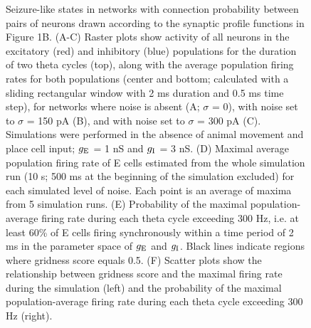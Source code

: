 \documentclass[a4paper,12pt]{article}
\newcommand{\ssc}[3]{\ensuremath{#1_{\text{#2}_{\text{#3}}}}}
\newcommand{\gE      }{\ssc{g}      {\scriptsize{E}}{}}
\newcommand{\gI      }{\ssc{g}      {\scriptsize{I}}{}}
\begin{document}
\begin{figure}[H]
    \internallinenumbers
    \caption{Seizure-like states in networks with connection probability
    between pairs of neurons drawn according to the synaptic profile functions
    in Figure 1B. (A-C) Raster plots show activity of all neurons in the
    excitatory (red) and inhibitory (blue) populations for the duration of two
    theta cycles (top), along with the average population firing rates for both
    populations (center and bottom; calculated with a sliding rectangular
    window with 2 ms duration and 0.5 ms time step), for networks where noise
    is absent (A; $\sigma$ = 0), with noise set to $\sigma$ = 150 pA (B), and
    with noise set to $\sigma$ = 300 pA (C). Simulations were performed in the
    absence of animal movement and place cell input; $\gE$ = 1 nS and $\gI$ = 3 nS.
    (D) Maximal average population firing rate of E cells estimated from the
    whole simulation run (10 s; 500 ms at the beginning of the simulation
    excluded) for each simulated level of noise. Each point is an average of
    maxima from 5 simulation runs.  (E) Probability of the maximal
    population-average firing rate during each theta cycle exceeding 300 Hz,
    i.e. at least 60\% of E cells firing synchronously within a time period of
    2 ms in the parameter space of $\gE$ and $\gI$. Black lines indicate regions
    where gridness score equals 0.5.
    (F) Scatter plots show the relationship between gridness score and the
    maximal firing rate during the simulation (left) and the probability of the
    maximal population-average firing rate during each theta cycle exceeding
    300 Hz (right).}
\end{figure}

\clearpage
\end{document}
